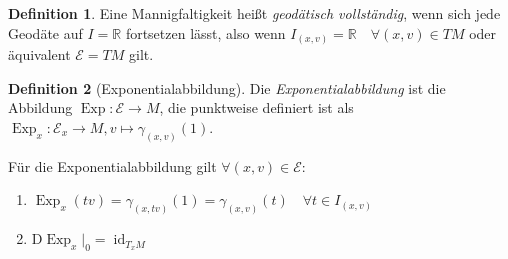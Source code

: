 \documentclass[a4paper]{scrreprt}
\numberwithin{equation}{chapter}
\newcommand{\DD}{\mathrm{D}}
\DeclareMathOperator{\id}{id}
\DeclareMathOperator{\Exp}{Exp}
\newcommand{\R}{\mathbb{R}}
\theoremstyle{definition}
\newtheorem{defn}{Definition}[section]
\begin{document}
		\begin{defn}
			Eine Mannigfaltigkeit heißt \emph{geodätisch vollständig}, wenn sich jede Geodäte auf $I=\R$ fortsetzen lässt, also wenn $I_{(x,v)}=\R\quad\forall (x,v)\in TM$ oder äquivalent $\mathcal{E}=TM$ gilt.
		\end{defn}
		\begin{defn}[Exponentialabbildung]
			Die \emph{Exponentialabbildung} ist die Abbildung $\Exp\colon \mathcal{E}\rightarrow M$, die punktweise definiert ist als $\Exp_x\colon \mathcal{E}_x\rightarrow M, v\mapsto \gamma_{(x,v)}(1)$.
			
			Für die Exponentialabbildung gilt $\forall(x,v)\in \mathcal{E}$:
			\begin{enumerate}[label=\arabic* .]
				\item $\Exp_x(tv)=\gamma_{(x,tv)}(1)=\gamma_{(x,v)}(t) \quad\forall t\in I_{(x,v)}$
				\item $\DD\Exp_x\vert_0=\id_{T_xM}$
			\end{enumerate}
		\end{defn}


\appendix
{} %
\end{document}
